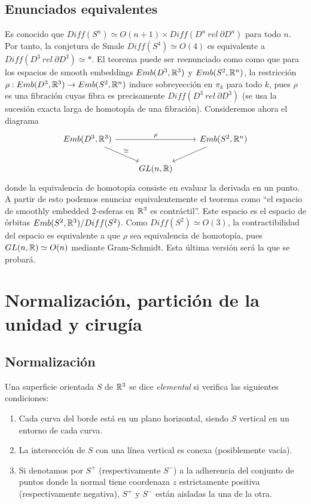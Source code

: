 \documentclass[twoside, 11pt]{article}
\begin{document}
\subsection{Enunciados equivalentes}\label{equivalentes}
Es conocido que $Diff(S^n)\simeq O(n+1)\times Diff(D^n\ rel\ \partial D^n)$ para todo $n$. Por tanto, la conjetura de Smale $Diff(S^4)\simeq O(4)$ es equivalente a $Diff(D^3\ rel\ \partial D^3)\simeq *$. El teorema puede ser reenunciado como como que para los espacios de smooth embeddings $Emb(D^3,\mathbb{R}^3)$ y $Emb(S^2,\mathbb{R}^n)$, la restricción $\rho:Emb(D^3,\mathbb{R}^3)\to Emb(S^2,\mathbb{R}^n)$ induce sobreyección en $\pi_k$ para todo $k$, pues $\rho$ es una fibración cuyas fibra es precisamente $Diff(D^3\ rel\ \partial D^3)$ (se usa la sucesión exacta larga de homotopía de una fibración). Consideremos ahora el diagrama
\[
\begin{tikzcd}
Emb(D^3,\R^3)\arrow[rr, "\rho"] \arrow[dr, "\simeq"]& & Emb(S^2,\R^n)\arrow[dl]\\
&GL(n,\R)&
\end{tikzcd}
\]
donde la equivalencia de homotopía consiste en evaluar la derivada en un punto. A partir de esto podemos enunciar equivalentemente el teorema como ``el espacio de smoothly embedded 2-esferas en $\mathbb{R}^3$ es contráctil''. Este espacio es el espacio de órbitas $Emb(S^2,\mathbb{R}^3)/Diff(S^2)$. Como $Diff(S^2)\simeq O(3)$, la contractibilidad del espacio es equivalente a que $\rho$ sea equivalencia de homotopía, pues $GL(n,\mathbb{R})\simeq O(n)$ mediante Gram-Schmidt. Esta última versión será la que se probará.


\section{Normalización, partición de la unidad y cirugía}
\subsection{Normalización}
\begin{defi}
Una superficie orientada $S$ de $\mathbb{R}^3$ se dice \emph{elemental} si verifica las siguientes condiciones:
\begin{enumerate}
\item Cada curva del borde está en un plano horizontal, siendo $S$ vertical en un entorno de cada curva. 
\item La intersección de $S$ con una línea vertical es conexa (posiblemente vacía).
\item Si denotamos por $S^+$ (respectivamente $S^-$) a la adherencia del conjunto de puntos donde la normal tiene coordenaza $z$ estrictamente positiva (respectivamente negativa), $S^+$ y $S^-$ están aisladas la una de la otra. 
\end{enumerate}
\end{defi}
\end{document}
